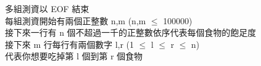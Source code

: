 多組測資以 EOF 結束\\
每組測資開始有兩個正整數 n,m (n,m $\leq$ 100000)\\
接下來一行有 n 個不超過一千的正整數依序代表每個食物的飽足度\\
接下來 m 行每行有兩個數字 l,r (1 $\leq$ l $\leq$ r $\leq$ n)\\
代表你想要吃掉第 l 個到第 r 個食物\\